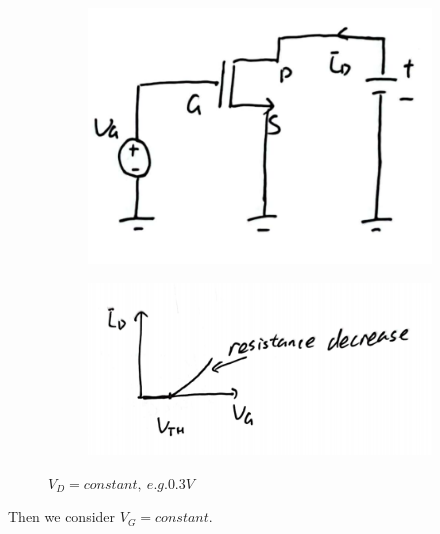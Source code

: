 \documentclass[fontset=windows]{article}
\begin{document}
\begin{figure}[ht]
    \centering
    \begin{subfigure}[b]{0.3\textwidth}
        \centering
        \includegraphics[width=\textwidth]{6.jpg}
        \label{fig:subfig1}
    \end{subfigure}
    \hfill
    \begin{subfigure}[b]{0.45\textwidth}
        \centering
        \includegraphics[width=\textwidth]{7.jpg}
        \label{fig:subfig2}
    \end{subfigure}
    \captionsetup{labelformat=empty}
    \caption{$V_D=constant, \ e.g. 0.3V$}
    \label{fig:both1}
\end{figure}

Then we consider $V_G=constant$.
\end{document}
